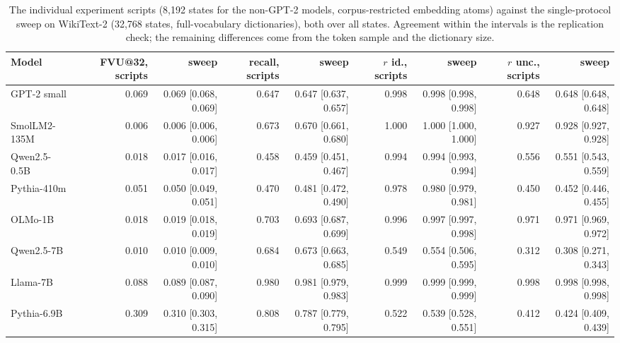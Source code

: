 \begin{table}[H]\centering\scriptsize
\caption{The individual experiment scripts (8{,}192 states for the non-GPT-2 models, corpus-restricted embedding atoms) against the single-protocol sweep on WikiText-2 (32{,}768 states, full-vocabulary dictionaries), both over all states. Agreement within the intervals is the replication check; the remaining differences come from the token sample and the dictionary size.}\label{app:ci-old}
\begin{adjustbox}{max width=\linewidth}
\begin{tabular}{lrrrrrrrr}\toprule
Model & FVU@32, scripts & sweep & recall, scripts & sweep & $r$ id., scripts & sweep & $r$ unc., scripts & sweep \\ \midrule
GPT-2 small & 0.069 & 0.069 [0.068, 0.069] & 0.647 & 0.647 [0.637, 0.657] & 0.998 & 0.998 [0.998, 0.998] & 0.648 & 0.648 [0.648, 0.648] \\
SmolLM2-135M & 0.006 & 0.006 [0.006, 0.006] & 0.673 & 0.670 [0.661, 0.680] & 1.000 & 1.000 [1.000, 1.000] & 0.927 & 0.928 [0.927, 0.928] \\
Qwen2.5-0.5B & 0.018 & 0.017 [0.016, 0.017] & 0.458 & 0.459 [0.451, 0.467] & 0.994 & 0.994 [0.993, 0.994] & 0.556 & 0.551 [0.543, 0.559] \\
Pythia-410m & 0.051 & 0.050 [0.049, 0.051] & 0.470 & 0.481 [0.472, 0.490] & 0.978 & 0.980 [0.979, 0.981] & 0.450 & 0.452 [0.446, 0.455] \\
OLMo-1B & 0.018 & 0.019 [0.018, 0.019] & 0.703 & 0.693 [0.687, 0.699] & 0.996 & 0.997 [0.997, 0.998] & 0.971 & 0.971 [0.969, 0.972] \\
Qwen2.5-7B & 0.010 & 0.010 [0.009, 0.010] & 0.684 & 0.673 [0.663, 0.685] & 0.549 & 0.554 [0.506, 0.595] & 0.312 & 0.308 [0.271, 0.343] \\
Llama-7B & 0.088 & 0.089 [0.087, 0.090] & 0.980 & 0.981 [0.979, 0.983] & 0.999 & 0.999 [0.999, 0.999] & 0.998 & 0.998 [0.998, 0.998] \\
Pythia-6.9B & 0.309 & 0.310 [0.303, 0.315] & 0.808 & 0.787 [0.779, 0.795] & 0.522 & 0.539 [0.528, 0.551] & 0.412 & 0.424 [0.409, 0.439] \\
\bottomrule\end{tabular}\end{adjustbox}
\end{table}
